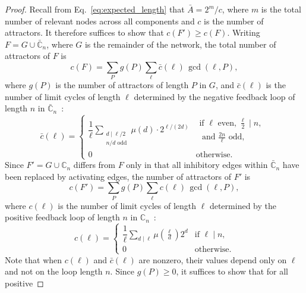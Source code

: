 \documentclass[11pt, reqno]{elsarticle}%
\theoremstyle{plain}
\begin{document}
\begin{proof}
Recall from Eq.~\eqref{eq:expected_length} that $\bar{A} = 2^m/c$,
where $m$ is the total number of relevant nodes across all components 
and $c$ is the number of attractors. It therefore suffices to show 
that $c(F') \ge c(F)$. Writing $F = G \cup \bar{\mathbb{C}}_n$, 
where $G$ is the remainder of the network, the total number of 
attractors of $F$ is
\begin{equation}
  c(F) = \sum_{P} g(P)\sum_{\ell} \bar{c}(\ell)\,\gcd(\ell,P),
  \label{eq:attractors_F}
\end{equation}
where $g(P)$ is the number of attractors of length $P$ in $G$, and 
$\bar{c}(\ell)$ is the number of limit cycles of length $\ell$ 
determined by the negative feedback loop of length $n$ in 
$\bar{\mathbb{C}}_n$~\cite{demongeot2010number,Golomb2017}:
\begin{equation}\label{eq:negative_circuit}
\bar{c}(\ell) = \begin{cases}
\dfrac{1}{\ell}\displaystyle\sum_{\substack{d\mid \ell/2 \\ 
n/d \text{ odd}}}\mu(d)\cdot 2^{\ell/(2d)} 
& \substack{\text{if } \ell \text{ even, } \tfrac{\ell}{2} \mid n, \\
\text{ and } \tfrac{2n}{\ell} \text{ odd,}}\\[10pt]
0 & \text{otherwise.}
\end{cases}
\end{equation}
Since $F' = G \cup \mathbb{C}_n$ differs from $F$ only in that all 
inhibitory edges within $\bar{\mathbb{C}}_n$ have been replaced by 
activating edges, the number of attractors of $F'$ is
\begin{equation}
  c(F') = \sum_{P} g(P)\sum_{\ell} c(\ell)\,\gcd(\ell,P),
  \label{eq:attractors_Fprime}
\end{equation}
where $c(\ell)$ is the number of limit cycles of length $\ell$ 
determined by the positive feedback loop of length $n$ in 
$\mathbb{C}_n$~\cite{demongeot2010number,Golomb2017}:
\begin{equation}\label{eq:positive_circuit}
c(\ell) = \begin{cases}
\dfrac{1}{\ell}\displaystyle\sum_{d\mid \ell}
\mu\!\left(\frac{\ell}{d}\right)2^d
& \text{if } \ell \mid n,\\[10pt]
0 & \text{otherwise.}
\end{cases}
\end{equation}
Note that when $c(\ell)$ and $\bar{c}(\ell)$ are nonzero, their 
values depend only on $\ell$ and not on the loop length $n$.
Since $g(P) \ge 0$, it suffices to show that for all positive 

\end{proof}
\end{document}
